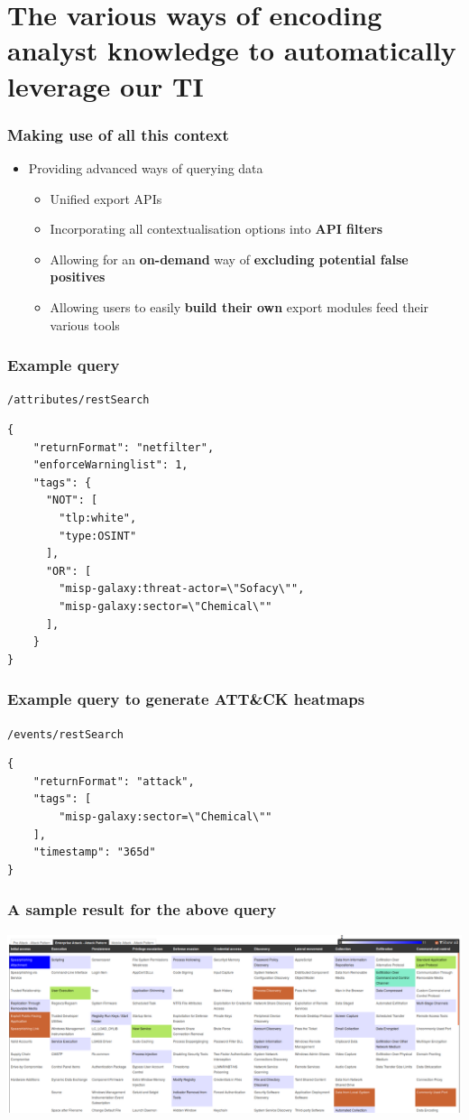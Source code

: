 \section{The various ways of encoding analyst knowledge to automatically leverage our TI}

\begin{frame}
  \frametitle{Making use of all this context}
  \begin{itemize}
    \item Providing advanced ways of querying data
    \begin{itemize}
      \item Unified export APIs
      \item Incorporating all contextualisation options into {\bf API filters}
      \item Allowing for an {\bf on-demand} way of {\bf excluding potential false positives}
      \item Allowing users to easily {\bf build their own} export modules feed their various tools
    \end{itemize}
  \end{itemize}
\end{frame}

\begin{frame}[fragile]
    \frametitle{Example query}
    \texttt{/attributes/restSearch}
    \begin{lstlisting}
{
    "returnFormat": "netfilter",
    "enforceWarninglist": 1,
    "tags": {
      "NOT": [
        "tlp:white",
        "type:OSINT"
      ],
      "OR": [
        "misp-galaxy:threat-actor=\"Sofacy\"",
        "misp-galaxy:sector=\"Chemical\""
      ],
    }
}
    \end{lstlisting}
\end{frame}

\begin{frame}[fragile]
    \frametitle{Example query to generate ATT\&CK heatmaps}
    \texttt{/events/restSearch}
    \begin{lstlisting}
{
    "returnFormat": "attack",
    "tags": [
        "misp-galaxy:sector=\"Chemical\""
    ],
    "timestamp": "365d"
}
    \end{lstlisting}
\end{frame}

\begin{frame}
  \frametitle{A sample result for the above query}
  \begin{center}
    \includegraphics[scale=0.2]{attack-screenshot.png}
  \end{center}
\end{frame}

